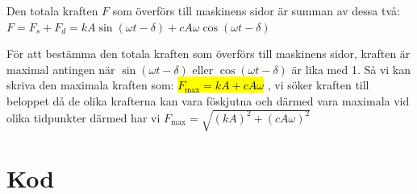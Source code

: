 \documentclass{assignment}
\begin{document}
Den totala kraften $F$ som överförs till maskinens sidor är summan av dessa två:
$F=F_s+F_d=k A \sin (\omega t-\delta)+c A \omega \cos (\omega t-\delta)$

För att bestämma den totala kraften som överförs till maskinens sidor, 
kraften är maximal antingen när $\sin (\omega t-\delta)$ eller $\cos (\omega t-\delta)$ 
är lika med 1. Så vi kan skriva den maximala kraften som: \hl{$F_{\max }=k A+c A \omega$} , 
vi söker kraften till beloppet då de olika krafterna kan vara föskjutna och därmed vara maximala vid olika tidpunkter 
därmed har vi $F_{\max }=\sqrt{(k A)^2+(c A \omega)^2}$
\newpage
\section{Kod}
 
\end{document}
